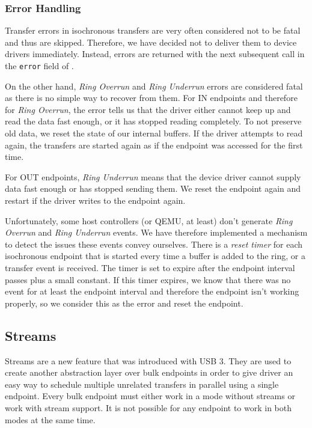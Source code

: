 \subsubsection{Error Handling}

Transfer errors in isochronous transfers are very often considered not to be fatal
and thus are skipped. Therefore, we have decided not to deliver them to device drivers
immediately. Instead, errors are returned with the next
subsequent  call in the \texttt{error} field of
.

On the other hand, \textit{Ring Overrun} and \textit{Ring Underrun} errors
are considered fatal as there is no simple way to recover from them. For IN
endpoints and therefore for \textit{Ring Overrun}, the error tells us that the
driver either cannot keep up and read the data fast enough, or it has stopped
reading completely. To not preserve old data, we reset the state of our
internal buffers. If the driver attempts to read again, the transfers are
started again as if the endpoint was accessed for the first time.

For OUT endpoints, \textit{Ring Underrun} means that the device driver cannot
supply data fast enough or has stopped sending them. We reset the endpoint
again and restart if the driver writes to the endpoint again.

Unfortunately, some host controllers (or QEMU, at least) don't generate
\textit{Ring Overrun} and \textit{Ring Underrun} events. We have therefore
implemented a mechanism to detect the issues these events convey ourselves.
There is a \textit{reset timer} for each isochronous endpoint that is started
every time a buffer is added to the ring, or a transfer event is received. The
timer is set to expire after the endpoint interval passes plus a small
constant. If this timer expires, we know that there was no event for at least
the endpoint interval and therefore the endpoint isn't working properly, so we
consider this as the error and reset the endpoint.

\subsection{Streams}

Streams are a new feature that was introduced with USB 3. They are used to
create another abstraction layer over bulk endpoints in order to give driver
an easy way to schedule multiple unrelated transfers in parallel using a single
endpoint. Every bulk endpoint must either work in a mode without streams or
work with stream support. It is not possible for any endpoint to work in both
modes at the same time.

